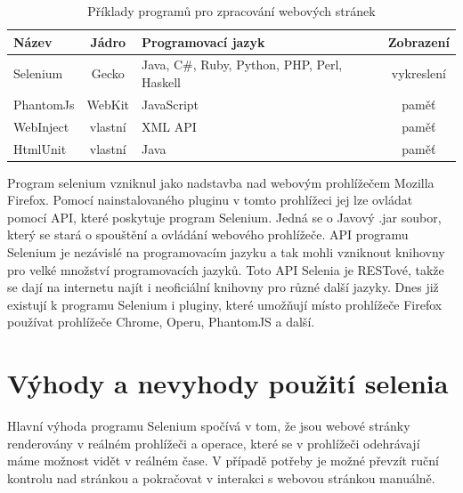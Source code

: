 \documentclass[thesis=M,czech]{FITthesis}[2013/05/10]
\begin{document}
\begin{table}[h]
\centering
\caption{Příklady programů pro zpracování webových stránek}\label{tab:web-engines}
\begin{tabular}{| l | c | p{5cm} | c |}
	\hline
	\textbf{Název} & 
	\textbf{Jádro} & 
	\textbf{Programovací jazyk} & 
	\textbf{Zobrazení} \\ \hline
	
	Selenium & %
	Gecko & 
	Java, C\#, Ruby, Python, PHP, Perl, Haskell & 
	vykreslení \\ \hline
	
	PhantomJs & %
	WebKit & 
	JavaScript & 
	paměť \\ \hline
	
	WebInject & %
	vlastní &
	XML API &
	paměť \\ \hline
	
	HtmlUnit & %
	vlastní &
	Java &
	paměť \\ \hline
		
\end{tabular}
\end{table}

Program selenium vzniknul jako nadstavba nad webovým prohlížečem 
Mozilla Firefox. Pomocí nainstalovaného pluginu v tomto prohlížeci jej 
lze ovládat pomocí API, které poskytuje program Selenium. Jedná se o 
Javový .jar soubor, který se stará o spouštění a ovládání webového 
prohlížeče. API programu Selenium je nezávislé na programovacím jazyku 
a tak mohli vzniknout knihovny pro velké množství programovacích 
jazyků. Toto API Selenia je RESTové, takže se dají na internetu najít 
i neoficiální knihovny pro různé další jazyky. Dnes již existují k 
programu Selenium i pluginy, které umožňují místo prohlížeče Firefox 
používat prohlížeče Chrome, Operu, PhantomJS a další.

\section{Výhody a nevyhody použití selenia}

Hlavní výhoda programu Selenium spočívá v tom, že jsou webové stránky 
renderovány v reálném prohlížeči a operace, které se v prohlížeči 
odehrávají máme možnost vidět v reálném čase. V případě potřeby je 
možné převzít ruční kontrolu nad stránkou a pokračovat v interakci s 
webovou stránkou manuálně. 
\end{document}

